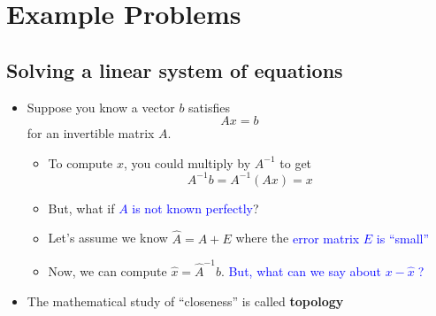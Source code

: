 \documentclass[11pt,twoside]{report}
\newcommand{\vecnot}[1]{#1}
\begin{document}
\section{Example Problems}


\subsection{Solving a linear system of equations} 


\begin{itemize}
  \item Suppose you know a vector $\vecnot{b}$ satisfies \[A \vecnot{x} = \vecnot{b}\] for an invertible matrix $A$. 
  \begin{itemize}
 \item  To compute $\vecnot{x}$, you could multiply by $A^{-1}$ to get 
  \[A^{-1} \vecnot{b} = A^{-1} (A \vecnot{x}) = \vecnot{x}\!\!\!\!\!\!\!\!\!\]
  
  \item But, what if \textcolor{blue}{$A$ is not known perfectly}?
  
  \item  Let's assume we know $\hat{A} = A + E$ where the \textcolor{blue}{error matrix $E$ is ``small''}
  
  \item  Now, we can compute $\hat{\vecnot{x}} = \hat{A}^{-1} \vecnot{b}$. \textcolor{blue}{But, what can we say about $\vecnot{x}-\hat{\vecnot{x}}\;$?} \vspace{3mm}

\end{itemize}

\item  The mathematical study of ``closeness'' is called \textbf{topology} 


\end{itemize}
\end{document}
